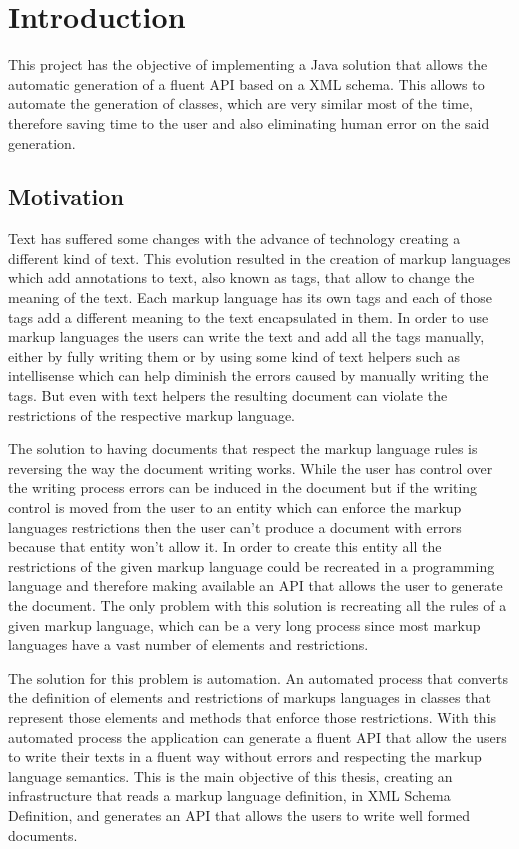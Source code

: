 % 
%  
%
\chapter{Introduction}

This project has the objective of implementing a Java solution that allows the automatic generation of a fluent API based on a XML schema. This allows to automate the generation of classes, which are very similar most of the time, therefore saving time to the user and also eliminating human error on the said generation.

\section{Motivation}

Text has suffered some changes with the advance of technology creating a different kind of text. This evolution resulted in the creation of markup languages which add annotations to text, also known as tags, that allow to change the meaning of the text. Each markup language has its own tags and each of those tags add a different meaning to the text encapsulated in them. In order to use markup languages the users can write the text and add all the tags manually, either by fully writing them or by using some kind of text helpers such as intellisense which can help diminish the errors caused by manually writing the tags. But even with text helpers the resulting document can violate the restrictions of the respective markup language. 

\noindent
The solution to having documents that respect the markup language rules is reversing the way the document writing works. While the user has control over the writing process errors can be induced in the document but if the writing control is moved from the user to an entity which can enforce the markup languages restrictions then the user can't produce a document with errors because that entity won't allow it. In order to create this entity all the restrictions of the given markup language could be recreated in a programming language and therefore making available an API that allows the user to generate the document. The only problem with this solution is recreating all the rules of a given markup language, which can be a very long process since most markup languages have a vast number of elements and restrictions. 

\noindent
The solution for this problem is automation. An automated process that converts the definition of elements and restrictions of markups languages in classes that represent those elements and methods that enforce those restrictions. With this automated process the application can generate a fluent API that allow the users to write their texts in a fluent way without errors and respecting the markup language semantics. This is the main objective of this thesis, creating an infrastructure that reads a markup language definition, in XML Schema Definition, and generates an API that allows the users to write well formed documents.

